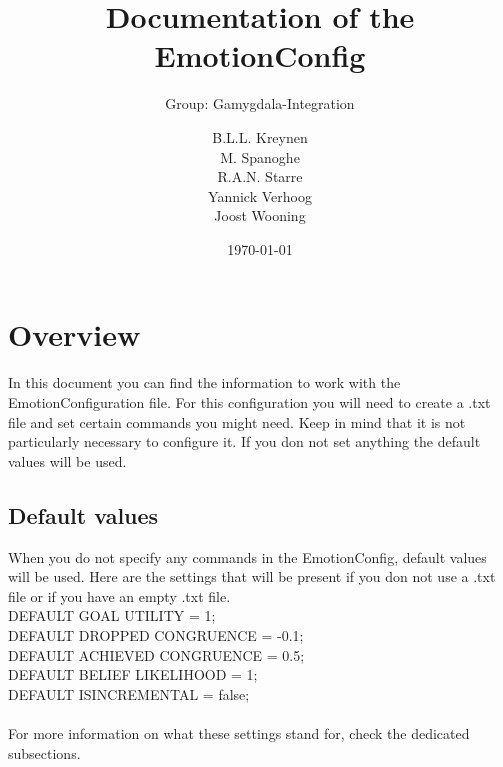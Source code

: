 \documentclass{scrartcl}
\begin{document}
\title{Documentation of the EmotionConfig}
\subtitle{Group: Gamygdala-Integration}
\date{\today{}}

\author{
    \begin{tabular}{l r}
      B.L.L. Kreynen\\
      M. Spanoghe\\
      R.A.N. Starre\\
      Yannick Verhoog\\
      Joost Wooning\\
    \end{tabular}
}

\maketitle \thispagestyle{empty} \pagebreak
\pagebreak
\tableofcontents
\pagebreak

\section{Overview}
In this document you can find the information to work with the EmotionConfiguration file. For this configuration you will need to create a .txt file and set certain commands you might need. Keep in mind that it is not particularly necessary to configure it. If you don not set anything the default values will be used.

\subsection{Default values}
When you do not specify any commands in the EmotionConfig, default values will be used. Here are the settings that will be present if you don not use a .txt file or if you have an empty .txt file.\\
DEFAULT GOAL UTILITY = 1;\\
DEFAULT DROPPED CONGRUENCE = -0.1;\\
DEFAULT ACHIEVED CONGRUENCE = 0.5;\\
DEFAULT BELIEF LIKELIHOOD = 1;\\
DEFAULT ISINCREMENTAL = false;\\
\\
For more information on what these settings stand for, check the dedicated subsections.
\end{document}
